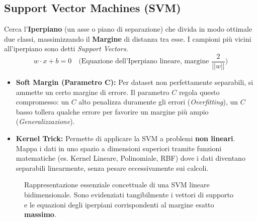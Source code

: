 \subsection{Support Vector Machines (SVM)}
Cerca l'\textbf{Iperpiano} (un asse o piano di separazione) che divida in modo ottimale due classi, massimizzando il \textbf{Margine} di distanza tra esse.
I campioni più vicini all'iperpiano sono detti \textit{Support Vectors}.
\begin{equation}
    w \cdot x + b = 0 \quad \text{(Equazione dell'Iperpiano lineare, margine $\frac{2}{||w||}$)}
\end{equation}
\begin{itemize}
    \item \textbf{Soft Margin (Parametro C):} Per dataset non perfettamente separabili, si ammette un certo margine di errore. Il parametro \textbf{$C$} regola questo compromesso: un $C$ alto penalizza duramente gli errori (\textit{Overfitting}), un $C$ basso tollera qualche errore per favorire un margine più ampio (\textit{Generalizzazione}).
    \item \textbf{Kernel Trick:} Permette di applicare la SVM a problemi \textbf{non lineari}.
    Mappa i dati in uno spazio a dimensioni superiori tramite funzioni matematiche (es.
    Kernel Lineare, Polinomiale, RBF) dove i dati diventano separabili linearmente, senza pesare eccessivamente sui calcoli.
\end{itemize}

\vspace{0.5cm}
\begin{figure}[H]
    \centering
    \caption{Rappresentazione essenziale concettuale di una SVM lineare bidimensionale. Sono evidenziati tangibilmente i vettori di supporto e le equazioni degli iperpiani corrispondenti al margine esatto \textbf{massimo}.}\label{fig:figure}
\end{figure}

